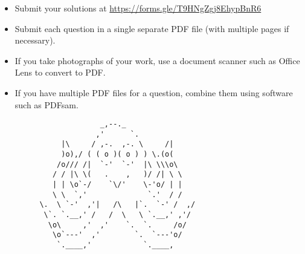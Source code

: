 \documentclass{article}
\begin{document}
\vfill
\begin{itemize}
	\item Submit your solutions at \href{https://forms.gle/T9HNgZgj8EhypBnR6}{https://forms.gle/T9HNgZgj8EhypBnR6}
	\item Submit each question in a single separate PDF file (with multiple pages if necessary).
	\item If you take photographs of your work, use a document scanner such as Office Lens to convert to PDF.
	\item If you have multiple PDF files for a question, combine them using software such as PDFsam.
\end{itemize}

\vfill
\centering
\begin{BVerbatim}
                       _,--._
                      ,'      `.
              |\     / ,-.  ,-. \     /|
              )o),/ ( ( o )( o ) ) \.(o(
             /o/// /|  `-'  `-'  |\ \\\o\
            / / |\ \(   .    ,   )/ /| \ \
            | | \o`-/    `\/'    \-'o/ | |
            \ \  `,'              `.'  / /
         \.  \ `-'  ,'|   /\   |`.  `-' /  ,/
          \`. `.__,' /   /  \   \ `.__,' ,'/
           \o\     ,'  ,'    `.  `.     /o/
            \o`---'  ,'        `.  `---'o/
             `.____,'            `.____,
\end{BVerbatim}
\end{document}
